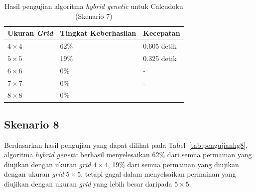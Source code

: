\begin{table}
\centering
\captionsetup{justification=centering}
\caption[Hasil pengujian algoritma \textit{hybrid genetic} untuk Calcudoku (Skenario 7)]{Hasil pengujian algoritma \textit{hybrid genetic} untuk Calcudoku (Skenario 7)}
\begin{tabular}{| l | l | l |}
\hline
Ukuran \textit{Grid} & Tingkat Keberhasilan & Kecepatan \\
\hline \hline
\begin{math}4 \times 4\end{math} & 62\% & 0.605 detik \\
\hline
\begin{math}5 \times 5\end{math} & 19\% & 0.325 detik \\
\hline
\begin{math}6 \times 6\end{math} & 0\% & - \\
\hline
\begin{math}7 \times 7\end{math} & 0\% & - \\
\hline
\begin{math}8 \times 8\end{math} & 0\% & - \\
\hline
\end{tabular}
\label{tab:pengujianhg7}
\end{table}

\subsection{Skenario 8}
\label{sec:skenario8}

Berdasarkan hasil pengujian yang dapat dilihat pada Tabel~\ref{tab:pengujianhg8}, algoritma \textit{hybrid genetic} berhasil menyelesaikan 62\% dari semua permainan yang diujikan dengan ukuran \textit{grid} \begin{math}4 \times 4\end{math}, 19\% dari semua permainan yang diujikan dengan ukuran \textit{grid} \begin{math}5 \times 5\end{math}, tetapi gagal dalam menyelsaikan permainan yang diujikan dengan ukuran \textit{grid} yang lebih besar daripada \begin{math}5 \times 5\end{math}.

